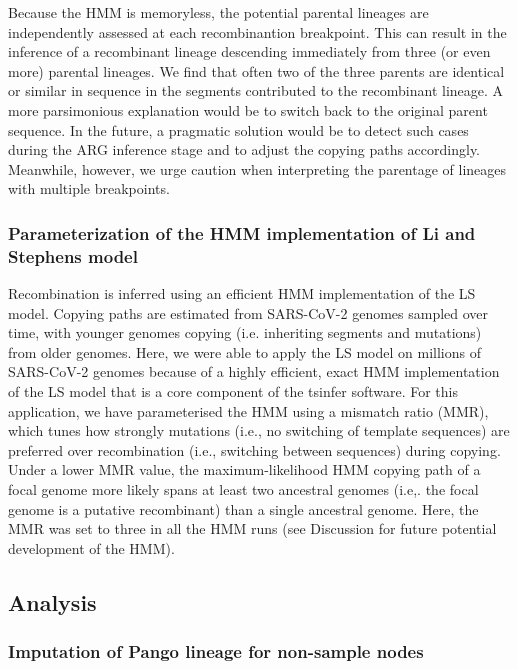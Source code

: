 \documentclass{article}
\begin{document}
Because the HMM is memoryless, the potential parental lineages are independently assessed at each recombinantion breakpoint. This can result in the inference of a recombinant lineage descending immediately from three (or even more) parental lineages. We find that often two of the three parents are identical or similar in sequence in the segments contributed to the recombinant lineage. A more parsimonious explanation would be to switch back to the original parent sequence. In the future, a pragmatic solution would be to detect such cases during the ARG inference stage and to adjust the copying paths accordingly. Meanwhile, however, we urge caution when interpreting the parentage of lineages with multiple breakpoints.

\subsubsection{Parameterization of the HMM implementation of Li and Stephens model}

Recombination is inferred using an efficient HMM implementation of the LS model. Copying paths are estimated from SARS-CoV-2 genomes sampled over time, with younger genomes copying (i.e. inheriting segments and mutations) from older genomes. Here, we were able to apply the LS model on millions of SARS-CoV-2 genomes because of a highly efficient, exact HMM implementation of the LS model that is a core component of the tsinfer software. For this application, we have parameterised the HMM using a mismatch ratio (MMR), which tunes how strongly mutations (i.e., no switching of template sequences) are preferred over recombination (i.e., switching between sequences) during copying. Under a lower MMR value, the maximum-likelihood HMM copying path of a focal genome more likely spans at least two ancestral genomes (i.e,. the focal genome is a putative recombinant) than a single ancestral genome. Here, the MMR was set to three in all the HMM runs (see Discussion for future potential development of the HMM).

\subsection{Analysis}

\subsubsection{Imputation of Pango lineage for non-sample nodes}
\end{document}
